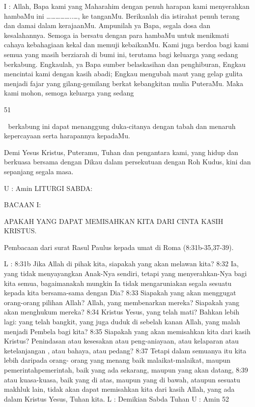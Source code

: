 \documentclass[10pt,a5paper,fancyhdr]{memoir}
\begin{document}
I : Allah, Bapa kami yang Maharahim dengan penuh harapan kami 
menyerahkan hambaMu ini ……………..…, ke tanganMu. 
Berikanlah dia istirahat penuh terang dan damai dalam kerajaanMu. 
Ampunilah ya Bapa, segala dosa dan kesalahannya. Semoga ia 
bersatu dengan para hambaMu untuk menikmati cahaya kebahagiaan 
kekal dan memuji kebaikanMu. 
Kami juga berdoa bagi kami semua yang masih berziarah di 
bumi ini, terutama bagi keluarga yang sedang berkabung. Engkaulah, 
ya Bapa sumber belaskasihan dan penghiburan, Engkau mencintai 
kami dengan kasih abadi; Engkau mengubah maut yang gelap gulita 
menjadi fajar yang gilang-gemilang berkat kebangkitan mulia 
PuteraMu. Maka kami mohon, semoga keluarga yang sedang 

51 



berkabung ini dapat menanggung duka-citanya dengan tabah dan 
menaruh kepercayaan serta harapannya kepadaMu. 

Demi Yesus Kristus, Puteramu, Tuhan dan pengantara kami, 
yang hidup dan berkuasa bersama dengan Dikau dalam persekutuan 
dengan Roh Kudus, kini dan sepanjang segala masa. 

U : Amin 
LITURGI SABDA: 

BACAAN I: 

APAKAH YANG DAPAT MEMISAHKAN KITA DARI CINTA 
KASIH KRISTUS. 

Pembacaan dari surat Rasul Paulus kepada umat di Roma 
(8:31b-35,37-39). 

L : 8:31b Jika Allah di pihak kita, siapakah yang akan melawan kita? 
8:32 Ia, yang tidak menyayangkan Anak-Nya sendiri, tetapi yang 
menyerahkan-Nya bagi kita semua, bagaimanakah mungkin Ia tidak 
mengaruniakan segala sesuatu kepada kita bersama-sama dengan 
Dia? 8:33 Siapakah yang akan menggugat orang-orang pilihan Allah? 
Allah, yang membenarkan mereka? Siapakah yang akan menghukum 
mereka? 8:34 Kristus Yesus, yang telah mati? Bahkan lebih lagi: 
yang telah bangkit, yang juga duduk di sebelah kanan Allah, yang 
malah menjadi Pembela bagi kita? 8:35 Siapakah yang akan 
memisahkan kita dari kasih Kristus? Penindasan atau kesesakan atau 
peng-aniayaan, atau kelaparan atau ketelanjangan , atau bahaya, atau 
pedang? 8:37 Tetapi dalam semuanya itu kita lebih daripada orang-
orang yang menang baik malaikat-malaikat, maupun pemerintahpemerintah, 
baik yang ada sekarang, maupun yang akan datang, 8:39 
atau kuasa-kuasa, baik yang di atas, maupun yang di bawah, ataupun 
sesuatu makhluk lain, tidak akan dapat memisahkan kita dari kasih 
Allah, yang ada dalam Kristus Yesus, Tuhan kita. 
L : Demikian Sabda Tuhan 
U : Amin 
52 
\end{document}
